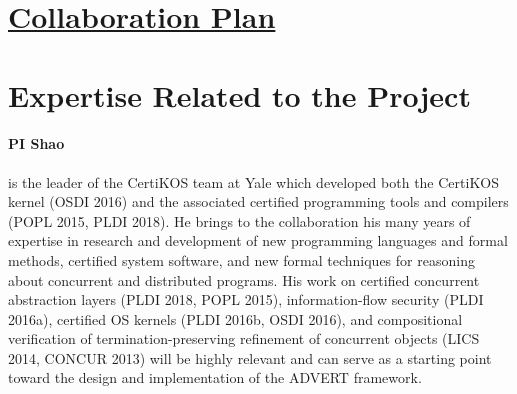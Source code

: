 \documentclass[11pt]{article}
\begin{document}
\thispagestyle{empty}
\section*{\underline{Collaboration Plan}}
\section{Expertise Related to the Project}

\paragraph{PI Shao} is the leader of the CertiKOS team at Yale
which developed both the CertiKOS kernel (OSDI 2016) and the
associated certified programming tools and compilers (POPL 2015, PLDI
2018).  He brings to the collaboration his many years of expertise in
research and development of new programming languages and formal
methods, certified system software, and new formal techniques for
reasoning about concurrent and distributed programs.  His work on
certified concurrent abstraction layers (PLDI 2018, POPL 2015),
information-flow security (PLDI 2016a), certified OS kernels (PLDI
2016b, OSDI 2016), and compositional verification of
termination-preserving refinement of concurrent objects (LICS 2014,
CONCUR 2013) will be highly relevant and can serve as a starting point
toward the design and implementation of the ADVERT framework.
\end{document}
